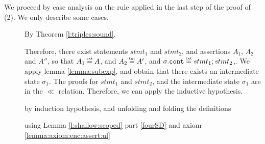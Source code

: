  \vspace{.2cm}
\noindent
We proceed by case analysis on the  rule applied in the last step of the proof of (2). We only describe some cases.

\begin{description} 
 
 \item[{}] 
 
 By Theorem \ref{l:triples:sound}.

\newcommand{\SPS}{\strut \ \ \hspace{0.5cm} \ \ }
 
\item[{}] 
Therefore, there exist statements $stmt_1$ and $stmt_2$, and assertions  $A_1$, $A_2$ and $A''$, so that $A_1\txteq A$, and $A_2 \txteq A'$, and $\sigma.\prg{cont}\txteq  stmt_1; stmt_2$,.
We apply lemma \ref{lemma:subexp}, and obtain that there exists an intermediate state $\sigma_1$. 
The proofs for  $stmt_1$ and $stmt_2$, and the intermediate state $\sigma_1$ are in the $\ll$ relation. 
Therefore, we can apply the inductive hypothesis.
 
  \item[{}]  by induction hypothesis, and unfolding and folding the definitions
  
 \item[{}]  using Lemma \ref{l:shallow:scoped} part \ref{fourSD}  and axiom \ref{lemma:axiom:enc:assert:ul}

 
\renewcommand{\Apr}{A_{pr}}
\newcommand{\Apra}{A_{pra}}
\newcommand{\Apoa}{A_{poa}}
\item[{}]
 

\end{description}
